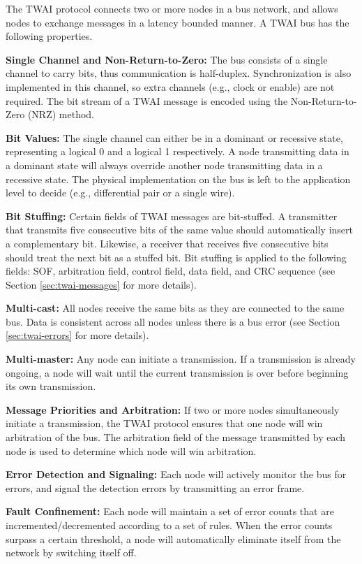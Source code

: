 \documentclass[main\_\_EN.tex]{subfiles}
\begin{document}
The TWAI protocol connects two or more nodes in a bus network, and allows nodes to exchange messages in a latency bounded manner. A TWAI bus has the following properties.

{\bfseries Single Channel and Non-Return-to-Zero:} The bus consists of a single channel to carry bits, thus communication is half-duplex. Synchronization is also implemented in this channel, so extra channels (e.g., clock or enable) are not required. The bit stream of a TWAI message is encoded using the Non-Return-to-Zero (NRZ) method.

{\bfseries Bit Values:} The single channel can either be in a dominant or recessive state, representing a logical 0 and a logical 1 respectively. A node transmitting data in a dominant state will always override another node transmitting data in a recessive state. The physical implementation on the bus is left to the application level to decide (e.g., differential pair or a single wire).

{\bfseries Bit Stuffing:} Certain fields of TWAI messages are bit-stuffed. A transmitter that transmits five consecutive bits of the same value should automatically insert a complementary bit. Likewise, a receiver that receives five consecutive bits should treat the next bit as a stuffed bit. Bit stuffing is applied to the following fields: SOF, arbitration field, control field, data field, and CRC sequence (see Section \ref{sec:twai-messages} for more details).

{\bfseries Multi-cast:} All nodes receive the same bits as they are connected to the same bus. Data is consistent across all nodes unless there is a bus error (see Section \ref{sec:twai-errors} for more details).

{\bfseries Multi-master:} Any node can initiate a transmission. If a transmission is already ongoing, a node will wait until the current transmission is over before beginning its own transmission.

{\bfseries Message Priorities and Arbitration:} If two or more nodes simultaneously initiate a transmission, the TWAI protocol ensures that one node will win arbitration of the bus. The arbitration field of the message transmitted by each node is used to determine which node will win arbitration.

{\bfseries Error Detection and Signaling: } Each node will actively monitor the bus for errors, and signal the detection errors by transmitting an error frame.

{\bfseries Fault Confinement:} Each node will maintain a set of error counts that are incremented/decremented according to a set of rules. When the error counts surpass a certain threshold, a node will automatically eliminate itself from the network by switching itself off.
\end{document}
